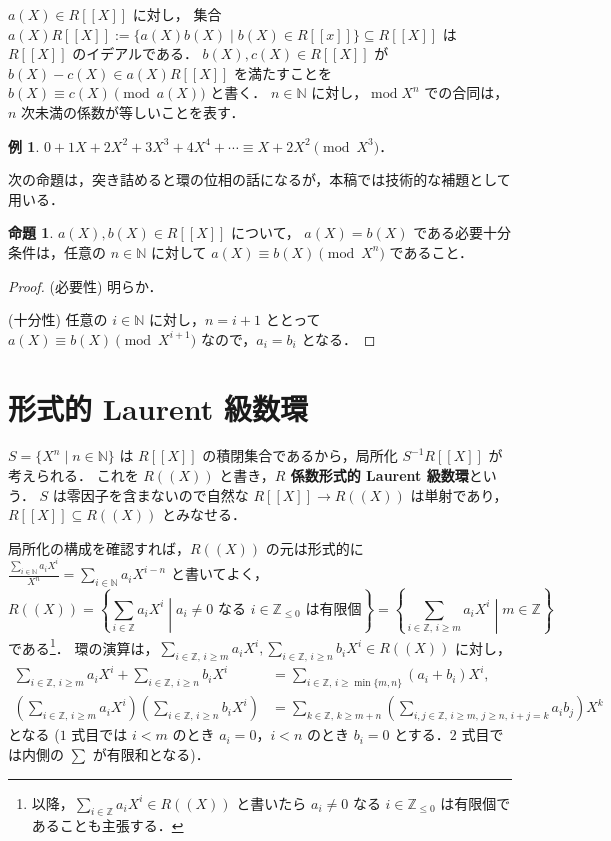 \documentclass{jsarticle}
\DeclareMathOperator{\Mod}{mod}
\newcommand{\N}{\mathbb{N}}
\newcommand{\Z}{\mathbb{Z}}
\newcommand{\longto}{\longrightarrow}
\newcommand{\middlemid}{\mathrel{}\middle|\mathrel{}}
\theoremstyle{definition}
\newtheorem*{Exm}{例}
\newtheorem{Prp}{命題}
\newenvironment{exm}{\begin{leftbar}\begin{Exm}}{\end{Exm}\end{leftbar}}
\newenvironment{prp}{\vspace{1ex}\begin{screen}\begin{Prp}}{\end{Prp}\end{screen}}
\newenvironment{prf}{\begin{leftbar}\begin{proof}}{\end{proof}\end{leftbar}}
\begin{document}
$a(X) \in R[[X]]$ に対し，
集合 $a(X) R[[X]] := \{ a(X) b(X) \mid b(X) \in R[[x]] \} \subseteq R[[X]]$ は
$R[[X]]$ のイデアルである．
$b(X), c(X) \in R[[X]]$ が $b(X) - c(X) \in a(X) R[[X]]$ を満たすことを
$b(X) \equiv c(X) \pmod{a(X)}$ と書く．
$n \in \N$ に対し，$\Mod X^n$ での合同は，$n$ 次未満の係数が等しいことを表す．

\begin{exm}
  $0 + 1 X + 2 X^2 + 3 X^3 + 4 X^4 + \cdots \equiv X + 2 X^2 \pmod{X^3}$．
\end{exm}

次の命題は，突き詰めると環の位相の話になるが，本稿では技術的な補題として用いる．

\begin{prp}
  \label{prp:mod-limit}
  $a(X), b(X) \in R[[X]]$ について，
  $a(X) = b(X)$ である必要十分条件は，任意の $n \in \N$ に対して $a(X) \equiv b(X) \pmod{X^n}$ であること．
\end{prp}
\begin{prf}
  (必要性)
  明らか．

  (十分性)
  任意の $i \in \N$ に対し，$n = i + 1$ ととって $a(X) \equiv b(X) \pmod{X^{i+1}}$ なので，$a_i = b_i$ となる．
\end{prf}


\section{形式的 Laurent 級数環}
$S = \{ X^n \mid n \in \N \}$ は $R[[X]]$ の積閉集合であるから，局所化 $S^{-1} R[[X]]$ が考えられる．
これを $R((X))$ と書き，\textbf{$R$ 係数形式的 Laurent 級数環}という．
$S$ は零因子を含まないので自然な $R[[X]] \longto R((X))$ は単射であり，$R[[X]] \subseteq R((X))$ とみなせる．

局所化の構成を確認すれば，$R((X))$ の元は形式的に
$\frac{\sum_{i\in\N} a_i X^i}{X^n} = \sum_{i\in\N} a_i X^{i-n}$ と書いてよく，
\[
  R((X)) = \left\{ \sum_{i\in\Z} a_i X^i \middlemid \text{$a_i \ne 0$ なる $i \in \Z_{\le 0}$ は有限個} \right\}
  = \left\{ \sum_{i\in\Z,\,i\ge m} a_i X^i \middlemid m \in \Z \right\}
\]
である\footnote{以降，$\sum_{i\in\Z} a_i X^i \in R((X))$ と書いたら $a_i \ne 0$ なる $i \in \Z_{\le 0}$ は有限個であることも主張する．}．
環の演算は，$\sum_{i\in\Z,\,i\ge m} a_i X^i, \sum_{i\in\Z,\,i\ge n} b_i X^i \in R((X))$ に対し，
\begin{align*}
  \sum_{i\in\Z,\,i\ge m} a_i X^i + \sum_{i\in\Z,\,i\ge n} b_i X^i &= \sum_{i\in\Z,\,i\ge\min\{m,n\}} (a_i + b_i) X^i, \\
  \left(\sum_{i\in\Z,\,i\ge m} a_i X^i\right) \left(\sum_{i\in\Z,\,i\ge n} b_i X^i\right) &= \sum_{k\in\Z,\,k\ge m+n} \left(\sum_{i,j\in\Z,\,i\ge m,\,j\ge n,\,i+j=k} a_i b_j\right) X^k
\end{align*}
となる ($1$ 式目では $i < m$ のとき $a_i = 0$，$i < n$ のとき $b_i = 0$ とする．$2$ 式目では内側の $\sum$ が有限和となる)．
\end{document}
